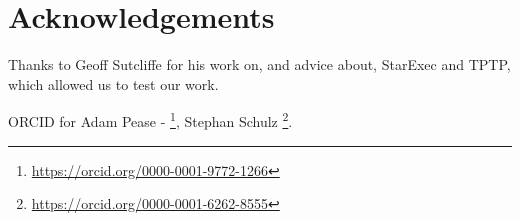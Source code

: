 \documentclass{llncs}
\begin{document}
\section{Acknowledgements}

Thanks to Geoff Sutcliffe for his work on, and advice about, StarExec and TPTP, which allowed us to test our work.

ORCID for Adam Pease - \footnote{\url{https://orcid.org/0000-0001-9772-1266}},
Stephan Schulz \footnote{\url{https://orcid.org/0000-0001-6262-8555}}.


\end{document}
